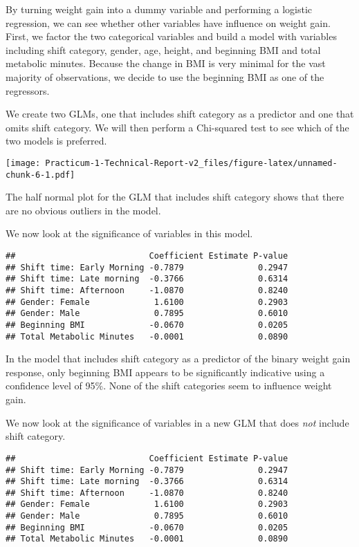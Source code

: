 \documentclass[]{article}
\begin{document}
By turning weight gain into a dummy variable and performing a logistic
regression, we can see whether other variables have influence on weight
gain. First, we factor the two categorical variables and build a model
with variables including shift category, gender, age, height, and
beginning BMI and total metabolic minutes. Because the change in BMI is
very minimal for the vast majority of observations, we decide to use the
beginning BMI as one of the regressors.

We create two GLMs, one that includes shift category as a predictor and
one that omits shift category. We will then perform a Chi-squared test
to see which of the two models is preferred.

\texttt{[image: Practicum-1-Technical-Report-v2\_files/figure-latex/unnamed-chunk-6-1.pdf]}

The half normal plot for the GLM that includes shift category shows that
there are no obvious outliers in the model.

We now look at the significance of variables in this model.

\begin{verbatim}
##                           Coefficient Estimate P-value
## Shift time: Early Morning -0.7879               0.2947
## Shift time: Late morning  -0.3766               0.6314
## Shift time: Afternoon     -1.0870               0.8240
## Gender: Female             1.6100               0.2903
## Gender: Male               0.7895               0.6010
## Beginning BMI             -0.0670               0.0205
## Total Metabolic Minutes   -0.0001               0.0890
\end{verbatim}

In the model that includes shift category as a predictor of the binary
weight gain response, only beginning BMI appears to be significantly
indicative using a confidence level of 95\%. None of the shift
categories seem to influence weight gain.

We now look at the significance of variables in a new GLM that does
\emph{not} include shift category.

\begin{verbatim}
##                           Coefficient Estimate P-value
## Shift time: Early Morning -0.7879               0.2947
## Shift time: Late morning  -0.3766               0.6314
## Shift time: Afternoon     -1.0870               0.8240
## Gender: Female             1.6100               0.2903
## Gender: Male               0.7895               0.6010
## Beginning BMI             -0.0670               0.0205
## Total Metabolic Minutes   -0.0001               0.0890
\end{verbatim}
\end{document}
